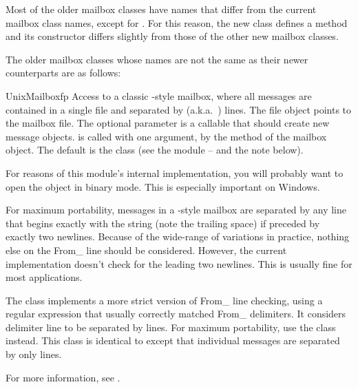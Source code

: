 Most of the older mailbox classes have names that differ from the current
mailbox class names, except for . For this reason, the new
 class defines a  method and its constructor
differs slightly from those of the other new mailbox classes.

The older mailbox classes whose names are not the same as their newer
counterparts are as follows:

\begin{classdesc}{UnixMailbox}{fp}
Access to a classic \UNIX-style mailbox, where all messages are
contained in a single file and separated by 
(a.k.a.\ ) lines.  The file object  points to the
mailbox file.  The optional  parameter is a callable that
should create new message objects.   is called with one
argument,  by the  method of the mailbox
object.  The default is the  class (see the
 module -- and the note below).

\begin{notice}
  For reasons of this module's internal implementation, you will
  probably want to open the  object in binary mode.  This is
  especially important on Windows.
\end{notice}

For maximum portability, messages in a \UNIX-style mailbox are
separated by any line that begins exactly with the string  (note the trailing space) if preceded by exactly two newlines.
Because of the wide-range of variations in practice, nothing else on
the From_ line should be considered.  However, the current
implementation doesn't check for the leading two newlines.  This is
usually fine for most applications.

The  class implements a more strict version of
From_ line checking, using a regular expression that usually correctly
matched From_ delimiters.  It considers delimiter line to be separated
by  lines.  For maximum portability,
use the  class instead.  This class is
identical to  except that individual messages are
separated by only  lines.

For more information, see
.
\end{classdesc}

